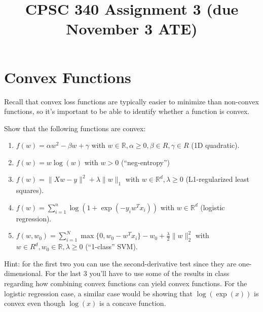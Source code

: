 \documentclass{article}
\def\blu#1{{\color{blu}#1}}
\def\norm#1{\|#1\|}
\def\R{\mathbb{R}}
\def\enum#1{\begin{enumerate}#1\end{enumerate}}
\begin{document}
\title{CPSC 340 Assignment 3 (due November 3 ATE)}
\author{}
\date{}
\maketitle
\vspace{-4em}



\section{Convex Functions}

Recall that convex loss functions are typically easier to minimize than non-convex functions, so it's important to be able to identify whether a function is convex.

\blu{Show that the following functions are convex}:

\enum{
\item $f(w) = \alpha w^2 - \beta w + \gamma$ with $w \in \R, \alpha \geq 0, \beta \in R, \gamma \in R$ (1D quadratic).
\item $f(w) = w\log(w) $ with $w > 0$ (``neg-entropy'')
\item $f(w) = \norm{Xw-y}^2 + \lambda\norm{w}_1$ with $w \in \R^d, \lambda \geq 0$ (L1-regularized least squares).
\item $f(w) = \sum_{i=1}^n \log(1+\exp(-y_iw^Tx_i)) $ with $w \in \R^d$ (logistic regression).
\item $f(w,w_0) = \sum_{i=1}^N\max\{0,w_0 - w^Tx_i\} - w_0 + \frac{\lambda}{2}\norm{w}_2^2$  with $w \in R^d, w_0 \in \R, \lambda \geq 0$ (``1-class'' SVM).
}

Hint: for the first two you can use the second-derivative test since they are one-dimensional. For the last 3 you'll have to use some of the results in class regarding how combining convex functions  can yield convex functions. For the logistic regression case, a similar case would be showing that $\log(\exp(x))$ is convex even though $\log(x)$ is a concave function.
\end{document}
